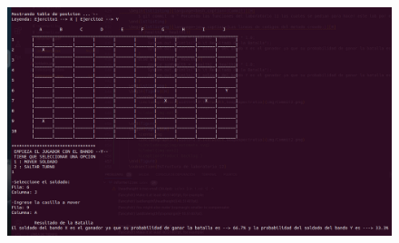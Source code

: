 \documentclass{article}
\begin{document}
	\begin{figure}[H]
		\centering
		\includegraphics[width=1.0\textwidth,keepaspectratio]{img/Commit2.1.png}
	\end{figure}
\end{document}
